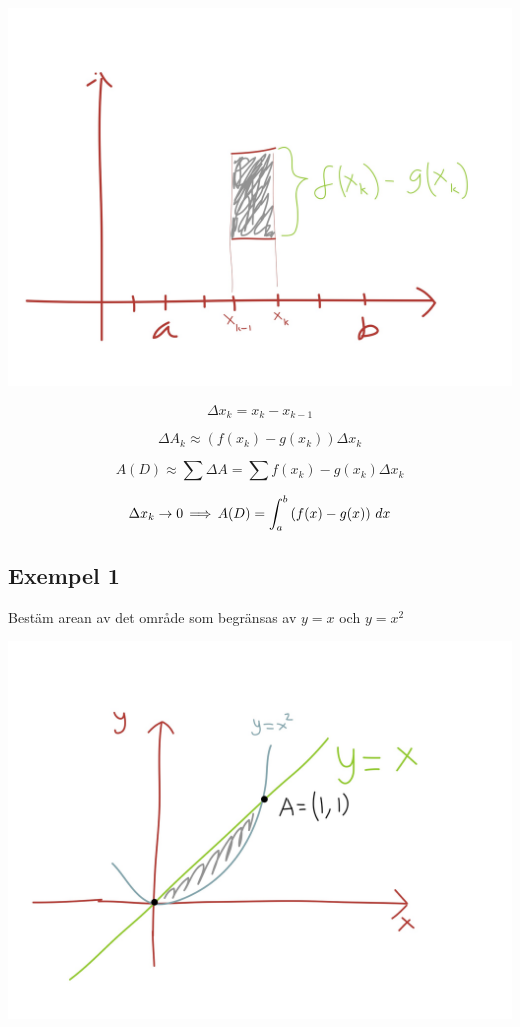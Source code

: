 \documentclass{article}
\begin{document}
\includegraphics[scale=0.15]{img/img3.jpg}

$$ \Delta x_k = x_k - x_{k-1} $$

$$ \Delta A_k \approx (f(x_k)-g(x_k))\Delta x_k $$

$$ A(D) \approx \sum{\Delta A} = \sum{f(x_k) - g(x_k)} \Delta x_k $$

$$ \Delta x_k \to 0 \operatorname{\implies} A(D) = \int^b_a{(f(x) - g(x))\ dx} $$

\subsection{Exempel 1}
Bestäm arean av det område som begränsas av $y=x$ och $y=x^2$

\includegraphics[scale=0.15]{img/img4.jpg}
\end{document}
